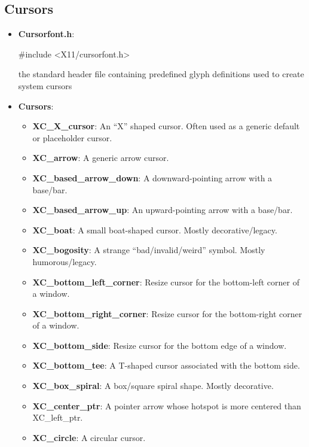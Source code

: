 \documentclass{report}
\begin{document}
    \subsection{Cursors}
    \begin{itemize}
        \item \textbf{Cursorfont.h}: 
            \bigbreak \noindent 
            \begin{cppcode}
            #include <X11/cursorfont.h>
            \end{cppcode}
            \bigbreak \noindent 
            the standard header file containing predefined glyph definitions used to create system cursors
        \item \textbf{Cursors}:
            \begin{itemize}
                \item \textbf{XC\_X\_cursor}:	An “X” shaped cursor. Often used as a generic default or placeholder cursor.
                \item \textbf{XC\_arrow}:	A generic arrow cursor.
                \item \textbf{XC\_based\_arrow\_down}:	A downward-pointing arrow with a base/bar.
                \item \textbf{XC\_based\_arrow\_up}:	An upward-pointing arrow with a base/bar.
                \item \textbf{XC\_boat}:	A small boat-shaped cursor. Mostly decorative/legacy.
                \item \textbf{XC\_bogosity}:	A strange “bad/invalid/weird” symbol. Mostly humorous/legacy.
                \item \textbf{XC\_bottom\_left\_corner}:	Resize cursor for the bottom-left corner of a window.
                \item \textbf{XC\_bottom\_right\_corner}:	Resize cursor for the bottom-right corner of a window.
                \item \textbf{XC\_bottom\_side}:	Resize cursor for the bottom edge of a window.
                \item \textbf{XC\_bottom\_tee}:	A T-shaped cursor associated with the bottom side.
                \item \textbf{XC\_box\_spiral}:	A box/square spiral shape. Mostly decorative.
                \item \textbf{XC\_center\_ptr}:	A pointer arrow whose hotspot is more centered than XC\_left\_ptr.
                \item \textbf{XC\_circle}:	A circular cursor.

\end{itemize}
\end{itemize}
\end{document}
